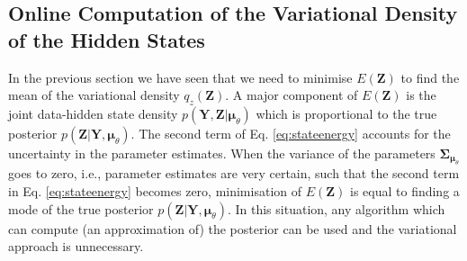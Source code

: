 \documentclass[a4paper,10pt]{article}
\newcommand{\bs}[1]{\mathbf{#1}}					%
\newcommand{\bgs}[1]{\boldsymbol{#1}}				%
\renewcommand{\ss}{z}         %
\newcommand{\spm}{\mu}    %
\renewcommand{\sp}{\theta}    %
\newcommand{\ppm}{\bgs{\spm}}   %
\newcommand{\Ps}{\bs{Z}}    %
\newcommand{\Po}{\bs{Y}}    %
\newcommand{\Cov}{\bgs{\Sigma}}			%
\begin{document}
\subsection{Online Computation of the Variational Density of the Hidden States}
In the previous section we have seen that we need to minimise $E(\Ps)$ to find the mean of the variational density $q_\ss(\Ps)$. A major component of $E(\Ps)$ is the joint data-hidden state density $p(\Po,\Ps|\ppm_\sp)$ which is proportional to the true posterior $p(\Ps|\Po,\ppm_\sp)$. The second term of Eq. \ref{eq:stateenergy} accounts for the uncertainty in the parameter estimates. When the variance of the parameters $\Cov_{\ppm_\sp}$ goes to zero, i.e., parameter estimates are very certain, such that the second term in Eq. \ref{eq:stateenergy} becomes zero, minimisation of $E(\Ps)$ is equal to finding a mode of the true posterior $p(\Ps|\Po,\ppm_\sp)$. In this situation, any algorithm which can compute (an approximation of) the posterior can be used and the variational approach is unnecessary. 
\end{document}
